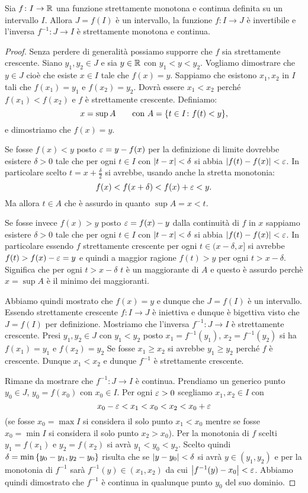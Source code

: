 \begin{theorem}
\label{th:inversa_continua}%
\mymark{*}%
%
Sia $f\colon I\to \mathbb R$ una funzione strettamente monotona
e continua definita su un intervallo $I$.
Allora $J=f(I)$ è un intervallo, la funzione $f\colon I \to J$
è invertibile e l'inversa $f^{-1}\colon J\to I$
è strettamente monotona e continua.
\end{theorem}
%
\begin{proof}
Senza perdere di generalità possiamo supporre che $f$
sia strettamente crescente.
Siano $y_1, y_2 \in J$ e sia $y\in \mathbb R$
con $y_1 < y < y_2$.
Vogliamo dimostrare che $y\in J$ cioè che esiste $x\in I$
tale che $f(x)=y$.
Sappiamo che esistono $x_1,x_2$ in $I$ tali che
$f(x_1) = y_1$ e $f(x_2) = y_2$.
Dovrà essere $x_1<x_2$ perché $f(x_1)<f(x_2)$ e
$f$ è strettamente crescente.
Definiamo:
\[
 x = \sup A
\qquad
\text{con } A={\left\{ t\in I\colon f(t)<y \right\}},
\]
e dimostriamo che $f(x)=y$.

Se fosse $f(x)<y$ posto $\varepsilon = y-f(x)$
per la definizione di limite dovrebbe esistere
$\delta>0$ tale che per ogni $t\in I$ con ${\left|t-x\right|}<\delta$
si abbia ${\left|f(t)-f(x)\right|}<\varepsilon$.
In particolare scelto $t=x+\frac \delta 2$
si avrebbe, usando anche la stretta monotonia:
\[
   f(x) < f(x+\delta) < f(x) + \varepsilon < y.
\]
Ma allora $t\in A$ che è assurdo in quanto
$\sup A = x < t$.

Se fosse invece $f(x)>y$ posto $\varepsilon = f(x)-y$
dalla continuità di $f$ in $x$ sappiamo
esistere $\delta>0$ tale che per ogni $t\in I$
con ${\left|t-x\right|}<\delta$ si abbia ${\left|f(t)-f(x)\right|}<\varepsilon$.
In particolare essendo $f$ strettamente crescente
per ogni $t\in (x-\delta,x]$
si avrebbe $f(t)>f(x)-\varepsilon = y$ e
quindi a maggior ragione
$f(t) > y$ per ogni $t>x-\delta$.
Significa che per ogni $t>x-\delta$
$t$ è un maggiorante di $A$ e questo è
assurdo perchè $x=\sup A$ è il minimo dei maggioranti.

Abbiamo quindi mostrato che $f(x)=y$ e dunque
che $J=f(I)$ è un intervallo.
Essendo strettamente crescente $f\colon I \to J$
è iniettiva e dunque è bigettiva visto che $J=f(I)$
per definizione.
Mostriamo che l'inversa $f^{-1}\colon J \to I$
è strettamente crescente.
Presi $y_1,y_2\in J$
con $y_1<y_2$ posto
$x_1=f^{-1}(y_1)$, $x_2 = f^{-1}(y_2)$
si ha $f(x_1)=y_1$ e $f(x_2)=y_2$
Se fosse $x_1 \ge x_2$ si avrebbe $y_1 \ge y_2$
perché $f$ è crescente. Dunque $x_1<x_2$
e dunque $f^{-1}$ è strettamente crescente.

Rimane da mostrare che $f^{-1}\colon J \to I$
è continua.
Prendiamo un generico punto $y_0\in J$, $y_0=f(x_0)$
con $x_0\in I$.
Per ogni $\varepsilon>0$
scegliamo $x_1,x_2\in I$ con
\[
 x_0-\varepsilon < x_1 < x_0 < x_2 < x_0+\varepsilon
\]
(se fosse $x_0=\max I$ si considera il solo punto $x_1<x_0$
mentre se fosse $x_0 = \min I$ si considera il solo punto
$x_2>x_0$).
Per la monotonia di $f$ scelti $y_1=f(x_1)$ e $y_2=f(x_2)$
si avrà $y_1 < y_0 < y_2$.
Scelto quindi $\delta = \min{\left\{ y_0-y_1,y_2-y_0 \right\}}$
risulta che se ${\left|y-y_0\right|}<\delta$ si avrà
$y\in(y_1,y_2)$ e per la monotonia di $f^{-1}$
sarà $f^{-1}(y)\in(x_1,x_2)$ da cui ${\left|f^{-1}(y)-x_0\right|}<\varepsilon$.
Abbiamo quindi dimostrato che $f^{-1}$ è continua
in qualunque punto $y_0$ del suo dominio.
\end{proof}

